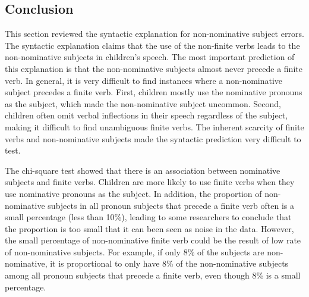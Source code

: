 \subsection{Conclusion}
This section reviewed the syntactic explanation for non-nominative subject errors. The syntactic explanation claims that the use of the non-finite verbs leads to the non-nominative subjects in children's speech. The most important prediction of this explanation is that the non-nominative subjects almost never precede a finite verb. In general, it is very difficult to find instances where a non-nominative subject precedes a finite verb. First, children mostly use the nominative pronouns as the subject, which made the non-nominative subject uncommon. Second, children often omit verbal inflections in their speech regardless of the subject, making it difficult to find unambiguous finite verbs. The inherent scarcity of finite verbs and non-nominative subjects made the syntactic prediction very difficult to test. 

The chi-square test showed that there is an association between nominative subjects and finite verbs. Children are more likely to use finite verbs when they use nominative pronouns as the subject. In addition, the proportion of non-nominative subjects in all pronoun subjects that precede a finite verb often is a small percentage (less than 10\%), leading to some researchers to conclude that the proportion is too small that it can been seen as noise in the data. However, the small percentage of non-nominative finite verb could be the result of low rate of non-nominative subjects. For example, if only 8\% of the subjects are non-nominative, it is proportional to only have 8\% of the non-nominative subjects among all pronoun subjects that precede a finite verb, even though 8\% is a small percentage.  

